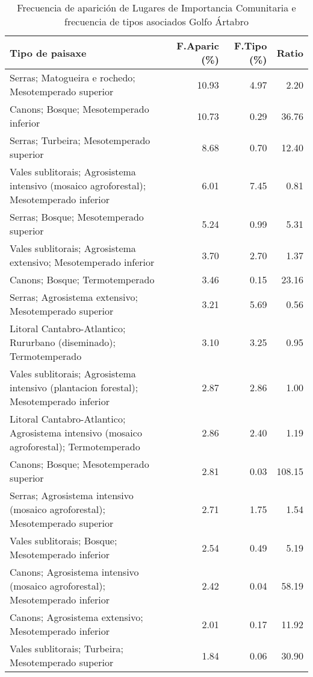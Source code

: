 \begin{table}[p]
\centering
\caption{Frecuencia de aparición de Lugares de Importancia Comunitaria e frecuencia de tipos asociados Golfo Ártabro} 
\label{vnatura1}
\begin{tabular}{lrrr}
  \hline
Tipo de paisaxe & F.Aparic (\%) & F.Tipo (\%) & Ratio \\ 
  \hline
Serras; Matogueira e rochedo; Mesotemperado superior & 10.93 & 4.97 & 2.20 \\ 
  Canons; Bosque; Mesotemperado inferior & 10.73 & 0.29 & 36.76 \\ 
  Serras; Turbeira; Mesotemperado superior & 8.68 & 0.70 & 12.40 \\ 
  Vales sublitorais; Agrosistema intensivo (mosaico agroforestal); Mesotemperado inferior & 6.01 & 7.45 & 0.81 \\ 
  Serras; Bosque; Mesotemperado superior & 5.24 & 0.99 & 5.31 \\ 
  Vales sublitorais; Agrosistema extensivo; Mesotemperado inferior & 3.70 & 2.70 & 1.37 \\ 
  Canons; Bosque; Termotemperado & 3.46 & 0.15 & 23.16 \\ 
  Serras; Agrosistema extensivo; Mesotemperado superior & 3.21 & 5.69 & 0.56 \\ 
  Litoral Cantabro-Atlantico; Rururbano (diseminado); Termotemperado & 3.10 & 3.25 & 0.95 \\ 
  Vales sublitorais; Agrosistema intensivo (plantacion forestal); Mesotemperado inferior & 2.87 & 2.86 & 1.00 \\ 
  Litoral Cantabro-Atlantico; Agrosistema intensivo (mosaico agroforestal); Termotemperado & 2.86 & 2.40 & 1.19 \\ 
  Canons; Bosque; Mesotemperado superior & 2.81 & 0.03 & 108.15 \\ 
  Serras; Agrosistema intensivo (mosaico agroforestal); Mesotemperado superior & 2.71 & 1.75 & 1.54 \\ 
  Vales sublitorais; Bosque; Mesotemperado inferior & 2.54 & 0.49 & 5.19 \\ 
  Canons; Agrosistema intensivo (mosaico agroforestal); Mesotemperado inferior & 2.42 & 0.04 & 58.19 \\ 
  Canons; Agrosistema extensivo; Mesotemperado inferior & 2.01 & 0.17 & 11.92 \\ 
  Vales sublitorais; Turbeira; Mesotemperado superior & 1.84 & 0.06 & 30.90 \\ 

\end{tabular}
\end{table}
